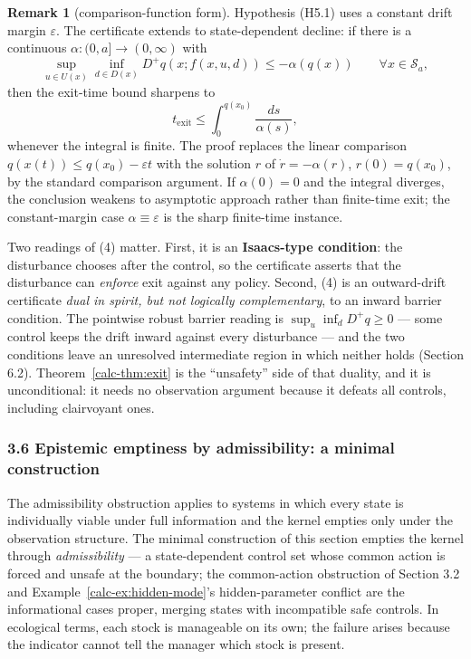 \documentclass[10pt,twocolumn]{article}
\theoremstyle{definition}
\newtheorem{remark}{Remark}
\begin{document}
\begin{remark}[comparison-function form]\label{calc-rem:comparison}
Hypothesis (H5.1) uses a constant drift margin \(\varepsilon\). The
certificate extends to state-dependent decline: if there is a continuous
\(\alpha:(0,a]\to(0,\infty)\) with
\[\sup_{u\in U(x)}\inf_{d\in D(x)} D^+q(x; f(x,u,d)) \le -\alpha(q(x)) \qquad \forall x\in\mathcal{S}_a,\]
then the exit-time bound sharpens to
\[t_{\mathrm{exit}} \le \int_0^{q(x_0)} \frac{ds}{\alpha(s)},\]
whenever the integral is finite. The proof replaces the linear comparison
\(q(x(t))\le q(x_0)-\varepsilon t\) with the solution \(r\) of
\(\dot r=-\alpha(r)\), \(r(0)=q(x_0)\), by the standard comparison
argument. If \(\alpha(0)=0\) and the integral diverges, the conclusion
weakens to asymptotic approach rather than finite-time exit; the
constant-margin case \(\alpha\equiv\varepsilon\) is the sharp finite-time
instance.
\end{remark}

Two readings of (4) matter. First, it is an \textbf{Isaacs-type
condition}: the disturbance chooses after the control, so the
certificate asserts that the disturbance can \emph{enforce} exit against
any policy. Second, (4) is an outward-drift certificate \emph{dual in
spirit, but not logically complementary}, to an inward barrier
condition. The pointwise robust barrier reading is
\(\sup_u \inf_d D^+ q \ge 0\) --- some control keeps the drift inward
against every disturbance --- and the two conditions leave an unresolved
intermediate region in which neither holds (Section 6.2). Theorem~\ref{calc-thm:exit} is
the ``unsafety'' side of that duality, and it is unconditional: it needs
no observation argument because it defeats all controls, including
clairvoyant ones.

\subsubsection{3.6 Epistemic emptiness by admissibility: a minimal
construction}\label{calc-epistemic-emptiness-by-admissibility-a-minimal-construction}

The admissibility obstruction applies to systems in which every state is
individually viable under full information and the kernel empties only under the observation structure.
The minimal construction of this section empties the kernel through
\emph{admissibility} --- a state-dependent control set whose common
action is forced and unsafe at the boundary; the common-action
obstruction of Section 3.2 and Example~\ref{calc-ex:hidden-mode}'s hidden-parameter
conflict are the informational cases proper, merging states with
incompatible safe controls. In ecological terms, each stock is manageable on its own; the failure arises because the indicator cannot tell the manager which stock is present.
\end{document}
